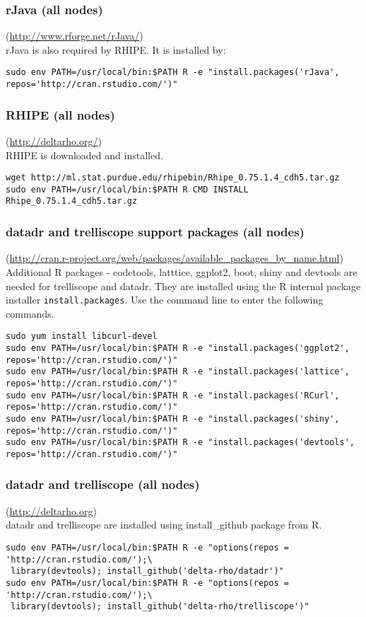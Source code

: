 \subsubsection{rJava (all nodes)}(\url{http://www.rforge.net/rJava/})\\
rJava is also required by RHIPE.  It is installed by:

\begin{verbatim}
sudo env PATH=/usr/local/bin:$PATH R -e "install.packages('rJava', repos='http://cran.rstudio.com/')"
\end{verbatim}

\subsubsection{RHIPE (all nodes)}(\url{http://deltarho.org/})\\
RHIPE is downloaded and installed.
\begin{verbatim}
wget http://ml.stat.purdue.edu/rhipebin/Rhipe_0.75.1.4_cdh5.tar.gz
sudo env PATH=/usr/local/bin:$PATH R CMD INSTALL Rhipe_0.75.1.4_cdh5.tar.gz
\end{verbatim}

\subsubsection{datadr and trelliscope support packages (all nodes)}(\url{http://cran.r-project.org/web/packages/available\_packages\_by\_name.html})\\
Additional R packages - codetools, latttice, ggplot2, boot, shiny and devtools are needed for trelliscope and datadr. They are installed using the R internal package installer \verb|install.packages|. Use the command line to enter the following commands.
\begin{verbatim}
sudo yum install libcurl-devel
sudo env PATH=/usr/local/bin:$PATH R -e "install.packages('ggplot2', repos='http://cran.rstudio.com/')"
sudo env PATH=/usr/local/bin:$PATH R -e "install.packages('lattice', repos='http://cran.rstudio.com/')"
sudo env PATH=/usr/local/bin:$PATH R -e "install.packages('RCurl', repos='http://cran.rstudio.com/')"
sudo env PATH=/usr/local/bin:$PATH R -e "install.packages('shiny', repos='http://cran.rstudio.com/')"
sudo env PATH=/usr/local/bin:$PATH R -e "install.packages('devtools', repos='http://cran.rstudio.com/')"
\end{verbatim}

\subsubsection{datadr and trelliscope (all nodes)}(\url{http://deltarho.org})\\
datadr and trelliscope are installed using install\_github package from R.
\begin{verbatim}
sudo env PATH=/usr/local/bin:$PATH R -e "options(repos = 'http://cran.rstudio.com/');\
 library(devtools); install_github('delta-rho/datadr')"
sudo env PATH=/usr/local/bin:$PATH R -e "options(repos = 'http://cran.rstudio.com/');\
 library(devtools); install_github('delta-rho/trelliscope')"
\end{verbatim}

